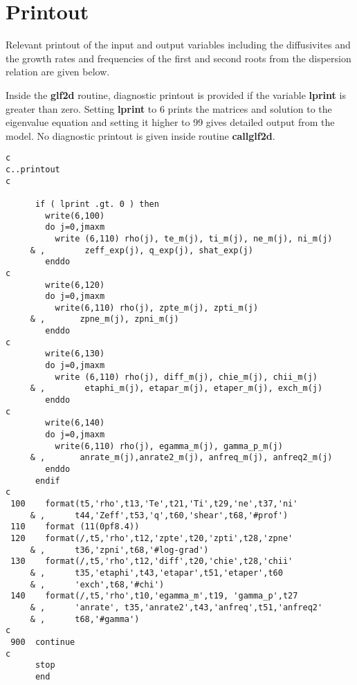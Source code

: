 \rm
\section{Printout}
Relevant printout of the input and output variables including
the diffusivites and the growth rates and frequencies of the
first and second roots from the dispersion relation are given below.

\noindent
Inside the {\bf glf2d} routine, diagnostic printout is provided
if the variable {\bf lprint} is greater than zero. Setting {\bf lprint}
to 6 prints the matrices and solution to the eigenvalue equation and
setting it higher to 99 gives detailed output from the model.
No diagnostic printout is given inside routine {\bf callglf2d}.

\small
\begin{verbatim}
c
c..printout
c

      if ( lprint .gt. 0 ) then
        write(6,100)
        do j=0,jmaxm
          write (6,110) rho(j), te_m(j), ti_m(j), ne_m(j), ni_m(j)
     & ,        zeff_exp(j), q_exp(j), shat_exp(j)
        enddo
c
        write(6,120)
        do j=0,jmaxm
          write(6,110) rho(j), zpte_m(j), zpti_m(j)
     & ,       zpne_m(j), zpni_m(j) 
        enddo
c
        write(6,130)
        do j=0,jmaxm
          write (6,110) rho(j), diff_m(j), chie_m(j), chii_m(j)
     & ,        etaphi_m(j), etapar_m(j), etaper_m(j), exch_m(j)
        enddo
c
        write(6,140)
        do j=0,jmaxm
          write(6,110) rho(j), egamma_m(j), gamma_p_m(j)
     & ,       anrate_m(j),anrate2_m(j), anfreq_m(j), anfreq2_m(j)
        enddo
      endif
c
 100    format(t5,'rho',t13,'Te',t21,'Ti',t29,'ne',t37,'ni'
     & ,      t44,'Zeff',t53,'q',t60,'shear',t68,'#prof')
 110    format (11(0pf8.4))
 120    format(/,t5,'rho',t12,'zpte',t20,'zpti',t28,'zpne'
     & ,      t36,'zpni',t68,'#log-grad')
 130    format(/,t5,'rho',t12,'diff',t20,'chie',t28,'chii'
     & ,      t35,'etaphi',t43,'etapar',t51,'etaper',t60
     & ,      'exch',t68,'#chi')
 140    format(/,t5,'rho',t10,'egamma_m',t19, 'gamma_p',t27
     & ,      'anrate', t35,'anrate2',t43,'anfreq',t51,'anfreq2'
     & ,      t68,'#gamma')
c
 900  continue
c
      stop
      end
\end{verbatim}

\rm

